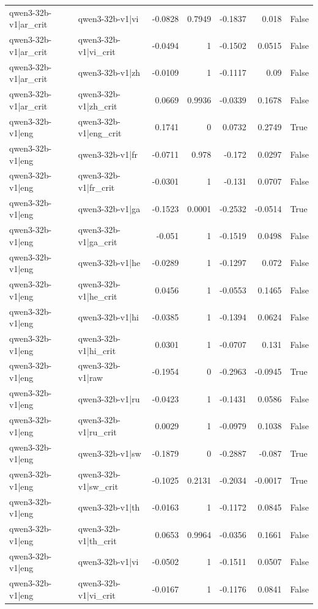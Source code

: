 \begin{table}
\begin{tabular}{l l r r r r l}
qwen3-32b-v1|ar_crit & qwen3-32b-v1|vi & -0.0828 & 0.7949 & -0.1837 & 0.018 & False \\
qwen3-32b-v1|ar_crit & qwen3-32b-v1|vi_crit & -0.0494 & 1 & -0.1502 & 0.0515 & False \\
qwen3-32b-v1|ar_crit & qwen3-32b-v1|zh & -0.0109 & 1 & -0.1117 & 0.09 & False \\
qwen3-32b-v1|ar_crit & qwen3-32b-v1|zh_crit & 0.0669 & 0.9936 & -0.0339 & 0.1678 & False \\
qwen3-32b-v1|eng & qwen3-32b-v1|eng_crit & 0.1741 & 0 & 0.0732 & 0.2749 & True \\
qwen3-32b-v1|eng & qwen3-32b-v1|fr & -0.0711 & 0.978 & -0.172 & 0.0297 & False \\
qwen3-32b-v1|eng & qwen3-32b-v1|fr_crit & -0.0301 & 1 & -0.131 & 0.0707 & False \\
qwen3-32b-v1|eng & qwen3-32b-v1|ga & -0.1523 & 0.0001 & -0.2532 & -0.0514 & True \\
qwen3-32b-v1|eng & qwen3-32b-v1|ga_crit & -0.051 & 1 & -0.1519 & 0.0498 & False \\
qwen3-32b-v1|eng & qwen3-32b-v1|he & -0.0289 & 1 & -0.1297 & 0.072 & False \\
qwen3-32b-v1|eng & qwen3-32b-v1|he_crit & 0.0456 & 1 & -0.0553 & 0.1465 & False \\
qwen3-32b-v1|eng & qwen3-32b-v1|hi & -0.0385 & 1 & -0.1394 & 0.0624 & False \\
qwen3-32b-v1|eng & qwen3-32b-v1|hi_crit & 0.0301 & 1 & -0.0707 & 0.131 & False \\
qwen3-32b-v1|eng & qwen3-32b-v1|raw & -0.1954 & 0 & -0.2963 & -0.0945 & True \\
qwen3-32b-v1|eng & qwen3-32b-v1|ru & -0.0423 & 1 & -0.1431 & 0.0586 & False \\
qwen3-32b-v1|eng & qwen3-32b-v1|ru_crit & 0.0029 & 1 & -0.0979 & 0.1038 & False \\
qwen3-32b-v1|eng & qwen3-32b-v1|sw & -0.1879 & 0 & -0.2887 & -0.087 & True \\
qwen3-32b-v1|eng & qwen3-32b-v1|sw_crit & -0.1025 & 0.2131 & -0.2034 & -0.0017 & True \\
qwen3-32b-v1|eng & qwen3-32b-v1|th & -0.0163 & 1 & -0.1172 & 0.0845 & False \\
qwen3-32b-v1|eng & qwen3-32b-v1|th_crit & 0.0653 & 0.9964 & -0.0356 & 0.1661 & False \\
qwen3-32b-v1|eng & qwen3-32b-v1|vi & -0.0502 & 1 & -0.1511 & 0.0507 & False \\
qwen3-32b-v1|eng & qwen3-32b-v1|vi_crit & -0.0167 & 1 & -0.1176 & 0.0841 & False \\

\end{tabular}
\end{table}
